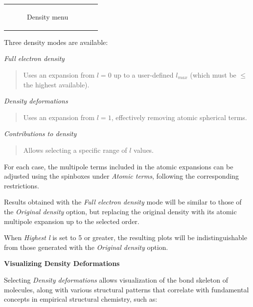 \documentclass[10pt]{article}
\begin{document}
\begin{tabular}{lr}
\begin{minipage}{.4\linewidth}
\begin{figure}[H]
\begin{center}
\end{center}
\caption{Density menu \label{fig:2_3_1}}
\end{figure} 
\end{minipage}
\end{tabular}

\newpage
Three density modes are available:

\begin{itemize}
\item {\it Full electron density}
\vspace*{-5mm}
\begin{quote}
\item Uses an expansion from $l = 0$ up to a user-defined $l_{max}$
(which must be $\le$ the highest available).
\end{quote}
\item {\it Density deformations}
\vspace*{-5mm}
\begin{quote}
\item Uses an expansion from $l = 1$, effectively removing atomic spherical terms.
\end{quote}
\item {\it Contributions to density}
\vspace*{-5mm}
\begin{quote}
\item Allows selecting a specific range of $l$ values.
\end{quote}
\end{itemize}

For each case, the multipole terms included in the atomic expansions
can be adjusted using the spinboxes under {\it Atomic terms}, following the corresponding restrictions.

Results obtained with the {\it Full electron density} mode will be similar
to those of the {\it Original density} option, but replacing the original density
with its atomic multipole expansion up to the selected order.

When {\it Highest l} is set to 5 or greater,
the resulting plots will be indistinguishable from those generated with the {\it Original density} option.

\vspace*{3mm}
{\bf Visualizing Density Deformations}
\vspace*{3mm}

Selecting {\it Density deformations} allows visualization of the bond skeleton of molecules,
along with various structural patterns that correlate with fundamental concepts in empirical structural chemistry,
such as:
\end{document}

